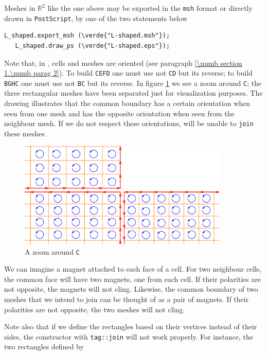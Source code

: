 Meshes in $ \mathbb{R}^2 $ like the one above may be exported in the {\small\tt msh} format
or directly drawn in {\small\tt PostScript}, by one of the two statements below

\begin{Verbatim}[commandchars=\\\{\},formatcom=\small\tt,baselinestretch=0.94]
   L_shaped.export_msh (\verde{"L-shaped.msh"});
   L_shaped.draw_ps (\verde{"L-shaped.eps"});
\end{Verbatim}

Note that, in \maniFEM, cells and meshes are oriented
(see paragraph \ref{\numb section 1.\numb parag 2}).
To build {\small\tt CEFD} one must use not {\small\tt CD} but its reverse;
to build {\small\tt BGHC} one must use not {\small\tt BC} but its reverse.
In figure \ref{\numb section 1.\numb fig 6} we see a zoom around {\small\tt C};
the three rectangular meshes have been separated just for visualization purposes.
The drawing illustrates that the common boundary has a certain orientation when seen
from one mesh and has the opposite orientation when seen from the neighbour mesh.
If we do not respect these orientations, {\maniFEM} will be unable to {\small\tt join}
these meshes.

\begin{figure}[ht]  \centering
  \includegraphics[width=100mm]{L-crack}
  \caption{A zoom around {\small\tt C}}
  \label{\numb section 1.\numb fig 6}
\end{figure}

We can imagine a magnet attached to each face of a cell.
For two neighbour cells, the common face will have two magnets, one from each cell.
If their polarities are not opposite, the magnets will not cling.
Likewise, the common boundary of two meshes that we intend to join can be thought of
as a pair of magnets.
If their polarities are not opposite, the two meshes will not cling.

Note also that if we define the rectangles based on their vertices instead of their sides, 
the {\small\tt {}} constructor with {\small\tt \textcolor{tag}{tag}::join} will not work properly. 
For instance, the two rectangles defined by

